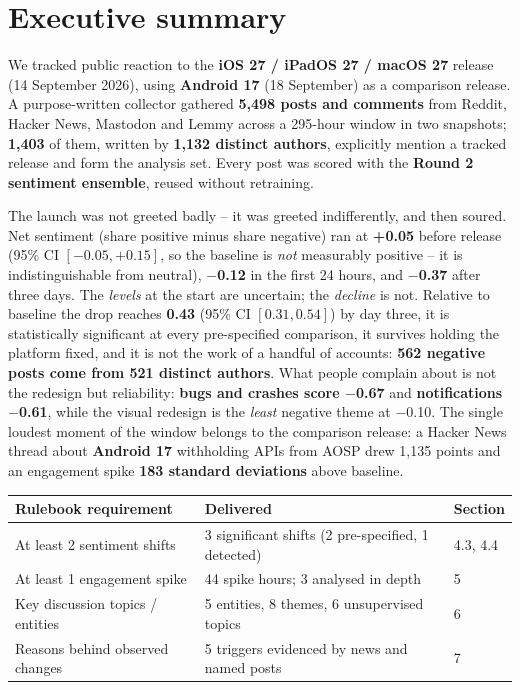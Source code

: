 \documentclass[11pt,a4paper]{article}
\begin{document}
\color{bodytext}

\section*{Executive summary}

We tracked public reaction to the \textbf{iOS 27 / iPadOS 27 / macOS 27} release (14 September 2026), using \textbf{Android 17} (18 September) as a comparison release. A purpose-written collector gathered \textbf{5,498 posts and comments} from Reddit, Hacker News, Mastodon and Lemmy across a 295-hour window in two snapshots; \textbf{1,403} of them, written by \textbf{1,132 distinct authors}, explicitly mention a tracked release and form the analysis set. Every post was scored with the \textbf{Round 2 sentiment ensemble}, reused without retraining.

\begin{insightbox}[HEADLINE]
The launch was not greeted badly -- it was greeted indifferently, and then soured. Net sentiment (share positive minus share negative) ran at \textbf{+0.05} before release (95\% CI $[-0.05, +0.15]$, so the baseline is \emph{not} measurably positive -- it is indistinguishable from neutral), \textbf{$-$0.12} in the first 24 hours, and \textbf{$-$0.37} after three days. The \emph{levels} at the start are uncertain; the \emph{decline} is not. Relative to baseline the drop reaches \textbf{0.43} (95\% CI $[0.31, 0.54]$) by day three, it is statistically significant at every pre-specified comparison, it survives holding the platform fixed, and it is not the work of a handful of accounts: \textbf{562 negative posts come from \textbf{521} distinct authors}. What people complain about is not the redesign but reliability: \textbf{bugs and crashes score $-$0.67} and \textbf{notifications $-$0.61}, while the visual redesign is the \emph{least} negative theme at $-$0.10. The single loudest moment of the window belongs to the comparison release: a Hacker News thread about \textbf{Android 17} withholding APIs from AOSP drew 1,135 points and an engagement spike \textbf{183 standard deviations} above baseline.
\end{insightbox}

\begin{table}[H]
\centering\small
\begin{tabular}{@{}lll@{}}
\toprule
\textbf{Rulebook requirement} & \textbf{Delivered} & \textbf{Section} \\
\midrule
At least 2 sentiment shifts & 3 significant shifts (2 pre-specified, 1 detected) & 4.3, 4.4 \\
At least 1 engagement spike & 44 spike hours; 3 analysed in depth & 5 \\
Key discussion topics / entities & 5 entities, 8 themes, 6 unsupervised topics & 6 \\
Reasons behind observed changes & 5 triggers evidenced by news and named posts & 7 \\
\bottomrule
\end{tabular}
\end{table}
\end{document}
